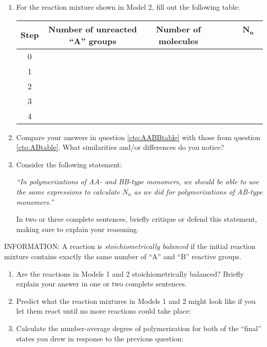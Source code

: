 	\begin{enumerate}[resume]
		\item \label{ctq:AABBtable} For the reaction mixture shown in Model 2, fill out the following table:
		
			\begin{table}[!h]
				\centering
				\renewcommand{\arraystretch}{3}
				\begin{tabular}{|c|c|c|c|}
					\hline
					\textbf{Step} &  \textbf{Number of unreacted ``A'' groups} & \textbf{Number of molecules} & ~~~~$\mathbf{N_n}$~~~~\\\hline
					0 &&& \\\hline
					1 &&& \\\hline
					2 &&& \\\hline
					3 &&& \\\hline
					4 &&& \\\hline
				\end{tabular}
			\end{table}
			
		\item Compare your answers in question \ref{ctq:AABBtable} with those from question \ref{ctq:ABtable}.  What similarities and/or differences do you notice?
		
		\item Consider the following statement:
		
			\emph{``In polymerizations of AA- and BB-type monomers, we should be able to use the same expressions to calculate $N_n$ as we did for polymerizations of AB-type monomers.''}
			
			In two or three complete sentences, briefly critique or defend this statement, making sure to explain your reasoning.
			
	\end{enumerate}
	
	INFORMATION: A reaction is \emph{stoichiometrically balanced} if the initial reaction mixture contains exactly the same number of ``A'' and ``B'' reactive groups.
	
	\begin{enumerate}[resume]
		\item Are the reactions in Models 1 and 2 stoichiometrically balanced?  Briefly explain your answer in one or two complete sentences.
		
		\item Predict what the reaction mixtures in Models 1 and 2 might look like if you let them react until no more reactions could take place:
		
		\item Calculate the number-average degree of polymerization for both of the ``final'' states you drew in response to the previous question:
	\end{enumerate}

